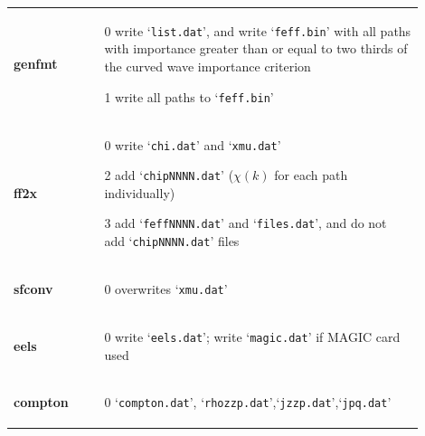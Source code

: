 \documentclass[11pt,oneside]{report} %
\newcommand{\file}[1]{`\texttt{#1}'}
\newcommand{\module}[1]{\textrm{\bf{#1}}}
\begin{document}
\begin{latexonly}
\begin{table}[htbp]
\begin{center}
\begin{tabular}[h]{p{0.1\linewidth}p{0.8\linewidth}}
      \module{genfmt} &
      \vspace{-4ex}
      \begin{itemize}
        \tightlist
      \item[0] write \file{list.dat}, and write \file{feff.bin} with all paths with importance greater than or equal to two thirds of the curved wave importance criterion
      \item[1] write all paths to \file{feff.bin}
      \end{itemize}\\
      \module{ff2x} &
      \vspace{-4ex}
      \begin{itemize}
        \tightlist
      \item[0] write \file{chi.dat} and \file{xmu.dat}
      \item[2] add \file{chipNNNN.dat} ($\chi(k)$ for each path individually)
      \item[3] add \file{feffNNNN.dat} and \file{files.dat}, and do not add \file{chipNNNN.dat} files
      \end{itemize}\\
      \module{sfconv} &
      \vspace{-4ex}
      \begin{itemize}
        \tightlist
      \item[0] overwrites \file{xmu.dat}
      \end{itemize}\\
      \module{eels} &
      \vspace{-4ex}
      \begin{itemize}
        \tightlist
      \item[0] write \file{eels.dat}; write \file{magic.dat} if MAGIC card used
      \end{itemize}\\
      \module{compton} &
      \vspace{-4ex}
      \begin{itemize}
        \tightlist
      \item[0] \file{compton.dat}, \file{rhozzp.dat},\file{jzzp.dat},\file{jpq.dat}
      \end{itemize}\\      
      \hline\hline
    \end{tabular}
    \label{tab:printlevels}
    \end{center}
\end{table}


\end{latexonly}
\end{document}
